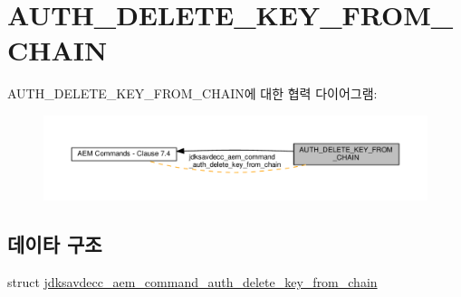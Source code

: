 \hypertarget{group__command__auth__delete__key__from__chain}{}\section{A\+U\+T\+H\+\_\+\+D\+E\+L\+E\+T\+E\+\_\+\+K\+E\+Y\+\_\+\+F\+R\+O\+M\+\_\+\+C\+H\+A\+IN}
\label{group__command__auth__delete__key__from__chain}
A\+U\+T\+H\+\_\+\+D\+E\+L\+E\+T\+E\+\_\+\+K\+E\+Y\+\_\+\+F\+R\+O\+M\+\_\+\+C\+H\+A\+I\+N에 대한 협력 다이어그램\+:
\nopagebreak
\begin{figure}[H]
\begin{center}
\leavevmode
\includegraphics[width=350pt]{group__command__auth__delete__key__from__chain}
\end{center}
\end{figure}
\subsection*{데이타 구조}
\begin{DoxyCompactItemize}
\item 
struct \hyperlink{structjdksavdecc__aem__command__auth__delete__key__from__chain}{jdksavdecc\+\_\+aem\+\_\+command\+\_\+auth\+\_\+delete\+\_\+key\+\_\+from\+\_\+chain}
\end{DoxyCompactItemize}
